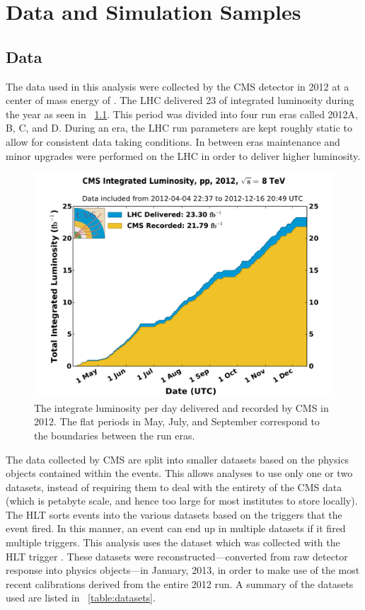 \chapter{Data and Simulation Samples}
\label{chatper:data_and_mc_samples}

\section{Data}

The data used in this analysis were collected by the CMS detector in 2012 at a
center of mass energy of \rootseight. The LHC delivered 23 \fbinv of integrated
luminosity during the year as seen in \FIG~\ref{fig:2012_luminosity}. This
period was divided into four run eras called 2012A, B, C, and D. During an era,
the LHC run parameters are kept roughly static to allow for consistent data
taking conditions. In between eras maintenance and minor upgrades were
performed on the LHC in order to deliver higher luminosity.

\begin{figure}[!htbp]
    \centering
    \includegraphics[width=\textwidth]{figures/2012_lumi.pdf}
    \caption{The integrate luminosity per day delivered and recorded by CMS in
        2012. The flat periods in May, July, and September correspond to the
        boundaries between the run eras.}
    \label{fig:2012_luminosity}
\end{figure}

The data collected by CMS are split into smaller datasets based on the physics
objects contained within the events. This allows analyses to use only one or
two datasets, instead of requiring them to deal with the entirety of the CMS
data (which is petabyte scale, and hence too large for most institutes to store
locally). The HLT sorts events into the various datasets based on the triggers
that the event fired. In this manner, an event can end up in multiple datasets
if it fired multiple triggers. This analysis uses the \SingleElectron dataset
which was collected with the HLT trigger \SingleElectronTrigger. These datasets
were reconstructed---converted from raw detector response into physics
objects---in January, 2013, in order to make use of the most recent
calibrations derived from the entire 2012 run. A summary of the datasets used
are listed in \TAB~\ref{table:datasets}.

